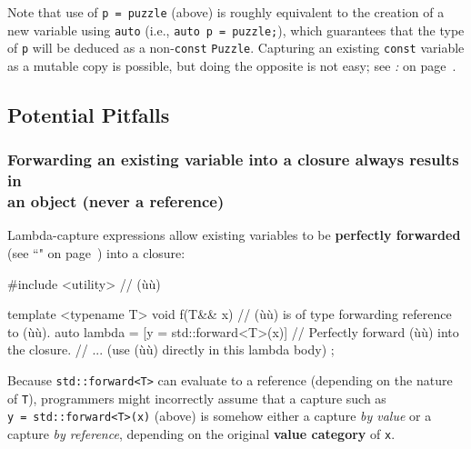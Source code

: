 \noindent Note that use of \texttt{p}~\texttt{=}~\texttt{puzzle} (above) is
roughly equivalent to the creation of a new variable using
\texttt{auto} (i.e.,
\texttt{auto}~\texttt{p}~\texttt{=}~\texttt{puzzle;}), which guarantees
that the type of \texttt{p} will be deduced as a non-\texttt{const}
\texttt{Puzzle}. Capturing an existing \texttt{const} variable as a mutable copy is
possible, but doing the opposite is not easy; see
\textit{: } on page~\pageref{there’s-no-easy-way-to-synthesize-a-const-data-member}.

\subsection[Potential Pitfalls]{Potential Pitfalls}\label{potential-pitfalls-lambdacapture}

\subsubsection[Forwarding an existing variable into a closure always results in an object (never a reference)]{Forwarding an existing variable into a closure always results in\\ an object (never a reference)}\label{forwarding-an-existing-variable-into-a-closure-always-results-in-an-object-(never-a-reference)}

Lambda-capture expressions allow existing variables to be
\textbf{perfectly forwarded} (see ``" on page~\pageref{forwardingref})
into a closure:

\begin{emcppslisting}[emcppsstandards={c++14}]
#include <utility>  // (ù{}ù)

template <typename T>
void f(T&& x)  // (ù{}ù) is of type forwarding reference to (ù{}ù).
{
    auto lambda = [y = std::forward<T>(x)]  
        // Perfectly forward (ù{}ù) into the closure.
    {
        // ... (use (ù{}ù) directly in this lambda body)
    };
}
\end{emcppslisting}
    
\noindent Because \texttt{std::forward<T>} can evaluate to a reference (depending
on the nature of \texttt{T}), programmers might incorrectly assume that
a capture such as \texttt{y}~\texttt{=}~\texttt{std::forward<T>(x)}
(above) is somehow either a capture \emph{by value} or a capture
\emph{by reference}, depending on the original \textbf{value category}
of \texttt{x}.

